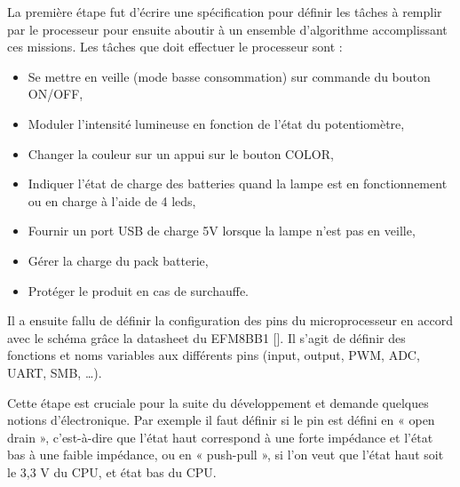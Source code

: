 \documentclass[a4paper, 11pt]{report}
\begin{document}

La première étape fut d’écrire une spécification pour définir les tâches à remplir par le processeur pour ensuite aboutir à un ensemble d’algorithme accomplissant ces missions.
Les tâches que doit effectuer le processeur sont :
\begin{itemize} %
\item Se mettre en veille (mode basse consommation) sur commande du bouton ON/OFF,
\item Moduler l’intensité lumineuse en fonction de l’état du potentiomètre,
\item Changer la couleur sur un appui sur le bouton COLOR,
\item Indiquer l’état de charge des batteries quand la lampe est en fonctionnement ou en charge à l’aide de 4 leds,
\item Fournir un port USB de charge 5V lorsque la lampe n’est pas en veille,
\item Gérer la charge du pack batterie,
\item Protéger le produit en cas de surchauffe.
\end{itemize}


Il a ensuite fallu de définir la configuration des pins du microprocesseur en accord avec le schéma grâce la datasheet du EFM8BB1 []. 
Il s’agit de définir des fonctions et noms variables aux différents pins (input, output, PWM, ADC, UART, SMB, …).


Cette étape est cruciale pour la suite du développement et demande quelques notions d’électronique. Par exemple il faut définir si le pin est défini en « open drain », c’est-à-dire que l’état haut correspond à une forte impédance et l’état bas à une faible impédance, ou en « push-pull », si l’on veut que l’état haut soit le 3,3 V du CPU, et état bas du CPU.

\end{document}
